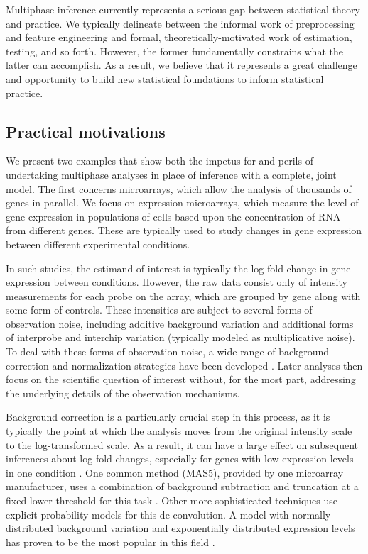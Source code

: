 Multiphase inference currently represents a serious gap between statistical theory and practice.
We typically delineate between the informal work of preprocessing and feature engineering and formal, theoretically-motivated work of estimation, testing, and so forth.
However, the former fundamentally constrains what the latter can accomplish.
As a result, we believe that it represents a great challenge and opportunity to build new statistical foundations to inform statistical practice.

\subsection{Practical motivations}
\label{multiphase:sec:examples}

We present two examples  that show both the impetus for and perils of undertaking multiphase analyses in place of inference with a complete, joint model. The first concerns  microarrays,  which allow the analysis of thousands of genes in parallel.
We focus on expression microarrays, which measure the level of gene expression in populations of cells based upon the concentration of RNA from different genes.
These are typically used to study changes in gene expression between different experimental conditions.

In such studies, the estimand of interest is typically the log-fold change in gene expression between conditions.
However, the raw data consist only of intensity measurements for each probe on the array, which are grouped by gene along with some form of controls.
These intensities are subject to several forms of observation noise, including additive background variation and additional forms of interprobe and interchip variation (typically modeled as multiplicative noise).
To deal with these forms of observation noise, a wide range of background correction and normalization strategies have been developed \citep[for a sampling, see][]{Tusher2001,Quackenbush2002,Affymetrix2002,Irizarry2003,McGee2006,Ritchie2007,Xie2009}.
Later analyses then focus on the scientific question of interest without, for the most part, addressing the underlying details of the observation mechanisms.

Background correction is a particularly crucial step in this process, as it is typically the point at which the analysis moves from the original intensity scale to the log-transformed scale.
As a result, it can have a large effect on subsequent inferences about log-fold changes, especially for genes with low expression levels in one condition \citep{Smyth2005,Irizarry2006}.
One common method (MAS5),  provided by one microarray manufacturer, uses a combination of background subtraction and truncation at a fixed lower threshold for this task \citep{Affymetrix2002}. Other more sophisticated techniques use explicit probability models for this de-convolution.
A model with normally-distributed background variation and exponentially distributed expression levels has proven to be the most popular in this field \citep{McGee2006,Xie2009}.

